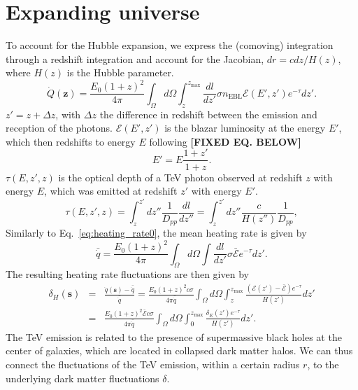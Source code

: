 \documentclass[twocolumns]{emulateapj}
\newcommand\Ec[1]{{\color{magenta} \bf #1}} %
\begin{document}
\section{Expanding universe}\label{sec:window_exp}

To account for the Hubble expansion, we express the (comoving) integration through a redshift integration and account for the Jacobian, $dr=c dz /H(z)$, where  $H(z)$ is the Hubble parameter.
\begin{equation}
  \label{eq:int_exp_heat}
  \dot{Q}(\mathbf{z})=\frac{E_0(1+z)^2}{4\pi}\int_{\Omega}d\Omega\int_z^{z_{\mathrm{max}}}\frac{dl}{dz'}\sigma n_{\mathrm{EBL}}\mathcal{E}(E',z') e^{-\tau} dz'.
\end{equation}
$z'=z+\Delta z$, with $\Delta z$ the difference in redshift between the emission and reception of the photons.
$\mathcal{E}(E',z')$ is the blazar luminosity at the energy $E'$, which then redshifts to energy $E$ following \Ec{[FIXED EQ. BELOW]}
\begin{equation}
\label{eq:E_z}
E'=E\frac{1+z'}{1+z}.
\end{equation}
$\tau(E,z',z)$ is the optical depth of a TeV photon observed at redshift $z$ with energy $E$, which was emitted at redshift $z'$ with energy $E'$.
\begin{equation}
\label{eq:tau}
\tau(E,z',z)=\int_z^{z'}dz''\frac{1}{D_{pp}}\frac{dl}{dz''}=\int_z^{z'}dz''\frac{c}{H(z'')}\frac{1}{D_{pp}},
\end{equation}
Similarly to Eq.~\eqref{eq:heating_rate0}, the mean heating rate is given by
\begin{equation}
\label{eq:mean_exp_heat}
\bar{\dot{q}}=\frac{E_0(1+z)^2}{4\pi}\int_{\Omega}d\Omega\int \frac{dl}{dz'}\sigma\bar{\mathcal{E}} e^{-\tau}dz'.
\end{equation}
The resulting heating rate fluctuations are then given by
\begin{eqnarray}
\label{eq:fluc_exp0}
\delta_H(\mathbf{s})&=&\frac{\dot{q}(\mathbf{s})-\bar{\dot{q}}}{\bar{\dot{q}}}=\frac{E_0(1+z)^2c\sigma}{4\pi\bar{\dot{q}}} \int_{\Omega}d\Omega\int_z^{z_{\mathrm{max}}} \frac{ ( \mathcal{E}(z')-\bar{\mathcal{E}}) e^{-\tau}}{H(z')} dz' \\ \nonumber
&=&\frac{E_0(1+z)^2\bar{\mathcal{E}} c\sigma}{4\pi\bar{\dot{q}}} \int_{\Omega}d\Omega\int_0^{z_{\mathrm{max}}} \frac{\delta_E(z') e^{-\tau}}{H(z')}dz'.
\end{eqnarray}
The TeV emission is related to the presence of supermassive black holes at the center of galaxies, which are located in collapsed dark matter halos. We can thus connect the fluctuations of the TeV emission, within a certain radius $r$, to the underlying dark matter fluctuations $\delta$.
\end{document}
